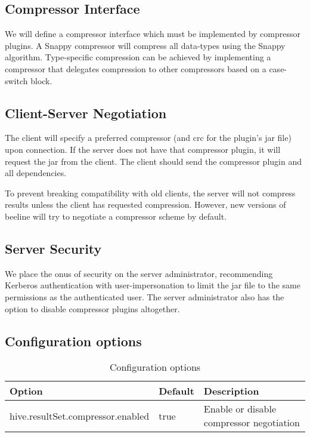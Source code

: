 \documentclass[11pt,a4paper]{article}
\begin{document}
	\subsection{Compressor Interface}
		We will define a compressor interface which must be implemented by compressor plugins.
		A Snappy compressor will compress all data-types using the Snappy algorithm.
		Type-specific compression can be achieved by implementing a compressor that delegates compression to other compressors based on a case-switch block.
		
	\subsection{Client-Server Negotiation}
		The client will specify a preferred compressor (and crc for the plugin's jar file) upon connection. 
		If the server does not have that compressor plugin, it will request the jar from the client. 
		The client should send the compressor plugin and all dependencies.
		
		To prevent breaking compatibility with old clients, the server will not compress results unless the client has requested compression.
		However, new versions of beeline will try to negotiate a compressor scheme by default.
		
	\subsection{Server Security}
		We place the onus of security on the server administrator, recommending Kerberos authentication with user-impersonation to limit the jar file to the same permissions as the authenticated user. 
		The server administrator also has the option to disable compressor plugins altogether.
		
	\subsection{Configuration options}
		\begin{table}[H]
			\begin{tabular}{| l | l | p{4cm} |} \hline
				\textbf{Option} & \textbf{Default} & \textbf{Description} \\ \hline
				hive.resultSet.compressor.enabled & true & Enable or disable compressor negotiation \\ \hline
			\end{tabular}
			\caption{Configuration options}
		\end{table}
\end{document}
